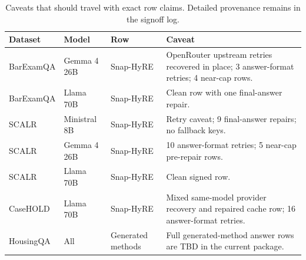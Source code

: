 \begin{table}[!htbp]
\centering
\caption{Caveats that should travel with exact row claims. Detailed provenance remains in the signoff log.}
\label{tab:caveat_ledger}
\scriptsize
\setlength{\tabcolsep}{4pt}
\begin{tabularx}{\textwidth}{lllY}
\toprule
Dataset & Model & Row & Caveat \\
\midrule
BarExamQA & Gemma 4 26B & Snap-HyRE & OpenRouter upstream retries recovered in place; 3 answer-format retries; 4 near-cap rows. \\
BarExamQA & Llama 70B & Snap-HyRE & Clean row with one final-answer repair. \\
SCALR & Ministral 8B & Snap-HyRE & Retry caveat; 9 final-answer repairs; no fallback keys. \\
SCALR & Gemma 4 26B & Snap-HyRE & 10 answer-format retries; 5 near-cap pre-repair rows. \\
SCALR & Llama 70B & Snap-HyRE & Clean signed row. \\
CaseHOLD & Llama 70B & Snap-HyRE & Mixed same-model provider recovery and repaired cache row; 16 answer-format retries. \\
HousingQA & All & Generated methods & Full generated-method answer rows are TBD in the current package. \\
\bottomrule
\end{tabularx}
\end{table}
